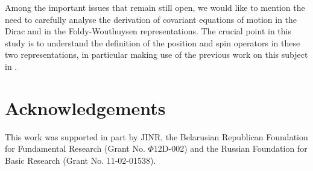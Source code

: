 \documentclass[preprint,showpacs,preprintnumbers,eqsecnum,amsmath,amssymb]{revtex4-1}
\begin{document}
Among the important issues that remain still open, we would like to mention the need
to carefully analyse the derivation of covariant equations of motion in the Dirac 
and in the Foldy-Wouthuysen representations. The crucial point in this study is to 
understand the definition of the position and spin operators in these two 
representations, in particular making use of the previous work on this subject in 
\cite{GIzvANB,wong3,Cianfrani,NW,dVFor,Dixon,Suttorp,Dekerf,Rivasbook,Stepanov,LFCosta}.

\section*{Acknowledgements}

This work was supported in part by JINR,
the Belarusian Republican Foundation for Fundamental Research
(Grant No. $\Phi$12D-002) and the Russian Foundation for Basic
Research (Grant No. 11-02-01538).
\end{document}
